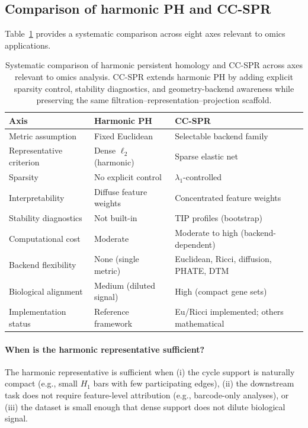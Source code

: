 \documentclass[11pt]{article}
\begin{document}
\subsection{Comparison of harmonic PH and CC-SPR}

Table~\ref{tab:hphcompare} provides a systematic comparison across eight axes relevant to omics applications.

\begin{table}[h]
\centering
\small
\begin{tabular}{p{2.5cm}p{3.0cm}p{3.0cm}}
\toprule
\textbf{Axis} & \textbf{Harmonic PH} & \textbf{CC-SPR} \\
\midrule
Metric assumption & Fixed Euclidean & Selectable backend family \\
Representative criterion & Dense $\ell_2$ (harmonic) & Sparse elastic net \\
Sparsity & No explicit control & $\lambda_1$-controlled \\
Interpretability & Diffuse feature weights & Concentrated feature weights \\
Stability diagnostics & Not built-in & TIP profiles (bootstrap) \\
Computational cost & Moderate & Moderate to high (backend-dependent) \\
Backend flexibility & None (single metric) & Euclidean, Ricci, diffusion, PHATE, DTM \\
Biological alignment & Medium (diluted signal) & High (compact gene sets) \\
Implementation status & Reference framework & Eu/Ricci implemented; others mathematical \\
\bottomrule
\end{tabular}
\caption{Systematic comparison of harmonic persistent homology and CC-SPR across axes relevant to omics analysis.
CC-SPR extends harmonic PH by adding explicit sparsity control, stability diagnostics, and geometry-backend awareness while preserving the same filtration--representation--projection scaffold.}
\label{tab:hphcompare}
\end{table}

\paragraph{When is the harmonic representative sufficient?}
The harmonic representative is sufficient when (i) the cycle support is naturally compact (e.g., small $H_1$ bars with few participating edges), (ii) the downstream task does not require feature-level attribution (e.g., barcode-only analyses), or (iii) the dataset is small enough that dense support does not dilute biological signal.
\end{document}
